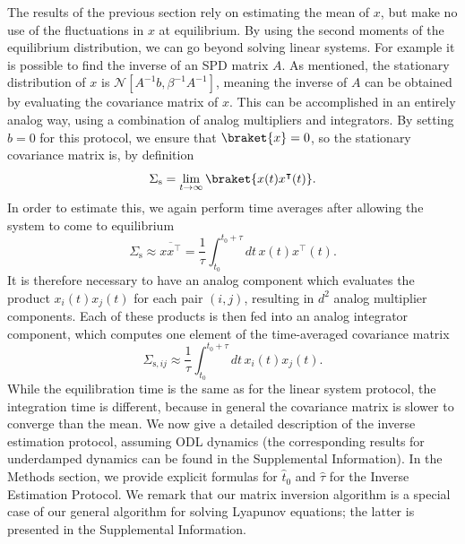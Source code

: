 \documentclass[prx,onecolumn,floatfix,longbibliography,notitlepage, nofootinbib,12pt]{revtex4-2}
\begin{document}
The results of the previous section rely on estimating the mean of $x$, but make no use of the fluctuations in $x$ at equilibrium. By using the second moments of the equilibrium distribution, we can go beyond solving linear systems. For example it is possible to find the inverse of an SPD matrix $A$. As mentioned, the stationary distribution of $x$ is $ \mathcal{N}[A^{-1} b, \beta^{-1} A^{-1}]$, meaning the inverse of $A$ can be obtained by evaluating the covariance matrix of $x$. This can be accomplished in an entirely analog way, using a combination of analog multipliers and integrators. By setting $b=0$ for this protocol, we ensure that $\braket{x} = 0$, so the stationary covariance matrix is, by definition 
\begin{equation}
    \Sigma_\text{s} = \lim_{t \to \infty}\braket{x(t) x^\intercal(t)}.
\end{equation}
In order to estimate this, we again perform time averages after allowing the system to come to equilibrium
\begin{equation}
    \Sigma_\text{s} \approx \overline{x x^\intercal} = \frac{1}{\tau}
    \int_{t_0}^{t_0 + \tau} dt\,  x(t) x^\intercal(t).
\end{equation}
It is therefore necessary to have an analog component which evaluates the product $x_i(t) x_j(t)$ for each pair $(i,j)$, resulting in $d^2$ analog multiplier components. Each of these products is then fed into an analog integrator component, which computes one element of the time-averaged covariance matrix
\begin{equation}
    \Sigma_{\text{s},ij} \approx \frac{1}{\tau} \int_{t_0}^{t_0 + \tau}dt \, x_i(t) x_j(t).
\end{equation}
While the equilibration time is the same as for the linear system protocol, the integration time is different, because in general the covariance matrix is slower to converge than the mean. We now give a detailed description of the inverse estimation protocol, assuming ODL dynamics (the corresponding results for underdamped dynamics can be found in the Supplemental Information). In the Methods section,  we provide explicit formulas for $\widehat{t}_0$ and $\widehat{\tau}$ for the Inverse Estimation Protocol. We remark that our matrix inversion algorithm is a special case of our general algorithm for solving Lyapunov equations; the latter is presented in the Supplemental Information.
\medskip
\end{document}
